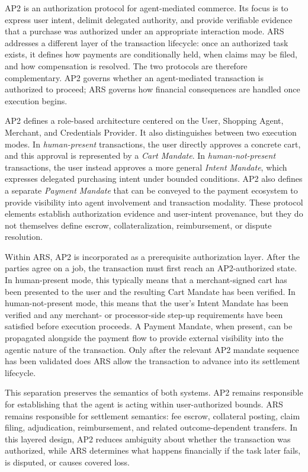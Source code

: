 \documentclass{article} %
\begin{document}
AP2 is an authorization protocol for agent-mediated commerce. Its focus is to express user intent, delimit delegated authority, and provide verifiable evidence that a purchase was authorized under an appropriate interaction mode. \textsc{ARS} addresses a different layer of the transaction lifecycle: once an authorized task exists, it defines how payments are conditionally held, when claims may be filed, and how compensation is resolved. The two protocols are therefore complementary. AP2 governs whether an agent-mediated transaction is authorized to proceed; \textsc{ARS} governs how financial consequences are handled once execution begins.

AP2 defines a role-based architecture centered on the User, Shopping Agent, Merchant, and Credentials Provider. It also distinguishes between two execution modes. In \emph{human-present} transactions, the user directly approves a concrete cart, and this approval is represented by a \textit{Cart Mandate}. In \emph{human-not-present} transactions, the user instead approves a more general \textit{Intent Mandate}, which expresses delegated purchasing intent under bounded conditions. AP2 also defines a separate \textit{Payment Mandate} that can be conveyed to the payment ecosystem to provide visibility into agent involvement and transaction modality. These protocol elements establish authorization evidence and user-intent provenance, but they do not themselves define escrow, collateralization, reimbursement, or dispute resolution.

Within \textsc{ARS}, AP2 is incorporated as a prerequisite authorization layer. After the parties agree on a job, the transaction must first reach an AP2-authorized state. In human-present mode, this typically means that a merchant-signed cart has been presented to the user and the resulting Cart Mandate has been verified. In human-not-present mode, this means that the user's Intent Mandate has been verified and any merchant- or processor-side step-up requirements have been satisfied before execution proceeds. A Payment Mandate, when present, can be propagated alongside the payment flow to provide external visibility into the agentic nature of the transaction. Only after the relevant AP2 mandate sequence has been validated does \textsc{ARS} allow the transaction to advance into its settlement lifecycle.

This separation preserves the semantics of both systems. AP2 remains responsible for establishing that the agent is acting within user-authorized bounds. \textsc{ARS} remains responsible for settlement semantics: fee escrow, collateral posting, claim filing, adjudication, reimbursement, and related outcome-dependent transfers. In this layered design, AP2 reduces ambiguity about whether the transaction was authorized, while \textsc{ARS} determines what happens financially if the task later fails, is disputed, or causes covered loss.
\end{document}
